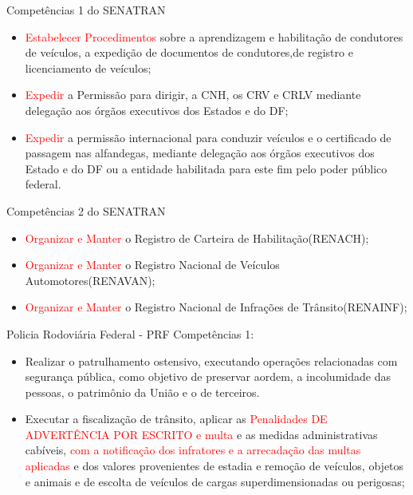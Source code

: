 \documentclass{beamer}
\begin{document}
\begin{frame}{Competências 1 do SENATRAN}
    \begin{itemize}
        \item \justifying \textcolor{red}{Estabelecer Procedimentos} sobre a aprendizagem e habilitação de condutores de veículos, a expedição de documentos de condutores,de registro e licenciamento de veículos;
        \item \justifying \textcolor{red}{Expedir} a Permissão para dirigir, a CNH, os CRV e CRLV mediante delegação aos órgãos executivos dos Estados e do DF;
        \item \justifying \textcolor{red}{Expedir} a permissão internacional para conduzir veículos e o certificado de passagem nas alfandegas, mediante delegação aos órgãos executivos dos Estado e do DF ou a entidade habilitada para este fim pelo poder público federal.
    \end{itemize}
\end{frame}
\begin{frame}{Competências 2 do SENATRAN}
    \begin{itemize}
        \item \justifying \textcolor{red}{Organizar e Manter} o Registro de Carteira de Habilitação(RENACH);
        \item \justifying \textcolor{red}{Organizar e Manter} o Registro Nacional de Veículos Automotores(RENAVAN);
        \item \justifying \textcolor{red}{Organizar e Manter} o Registro Nacional de Infrações de Trânsito(RENAINF);
    \end{itemize}
\end{frame}
\begin{frame}{Policia Rodoviária Federal - PRF}
Competências 1:
    \begin{itemize}
        \item \justifying Realizar o patrulhamento ostensivo, executando operações relacionadas com segurança pública, como objetivo de preservar aordem, a incolumidade das pessoas, o patrimônio da União e o de terceiros.
        \item \justifying Executar a fiscalização de trânsito, aplicar as \textcolor{red}{Penalidades DE ADVERTÊNCIA POR ESCRITO e multa} e as medidas administrativas cabíveis, \textcolor{red}{com a notificação dos infratores e a arrecadação das multas aplicadas} e dos valores provenientes de estadia e remoção de veículos, objetos e animais e de escolta de veículos de cargas superdimensionadas ou perigosas;
    \end{itemize}
\end{frame}
\end{document}
